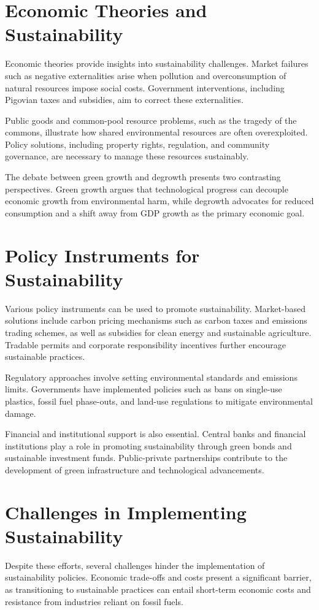 \documentclass[12pt]{article}
\begin{document}
\section{Economic Theories and Sustainability}
Economic theories provide insights into sustainability challenges. Market failures such as negative externalities arise when pollution and overconsumption of natural resources impose social costs. Government interventions, including Pigovian taxes and subsidies, aim to correct these externalities. 

Public goods and common-pool resource problems, such as the tragedy of the commons, illustrate how shared environmental resources are often overexploited. Policy solutions, including property rights, regulation, and community governance, are necessary to manage these resources sustainably.

The debate between green growth and degrowth presents two contrasting perspectives. Green growth argues that technological progress can decouple economic growth from environmental harm, while degrowth advocates for reduced consumption and a shift away from GDP growth as the primary economic goal.

\section{Policy Instruments for Sustainability}
Various policy instruments can be used to promote sustainability. Market-based solutions include carbon pricing mechanisms such as carbon taxes and emissions trading schemes, as well as subsidies for clean energy and sustainable agriculture. Tradable permits and corporate responsibility incentives further encourage sustainable practices.

Regulatory approaches involve setting environmental standards and emissions limits. Governments have implemented policies such as bans on single-use plastics, fossil fuel phase-outs, and land-use regulations to mitigate environmental damage.

Financial and institutional support is also essential. Central banks and financial institutions play a role in promoting sustainability through green bonds and sustainable investment funds. Public-private partnerships contribute to the development of green infrastructure and technological advancements.

\section{Challenges in Implementing Sustainability}
Despite these efforts, several challenges hinder the implementation of sustainability policies. Economic trade-offs and costs present a significant barrier, as transitioning to sustainable practices can entail short-term economic costs and resistance from industries reliant on fossil fuels.
\end{document}
